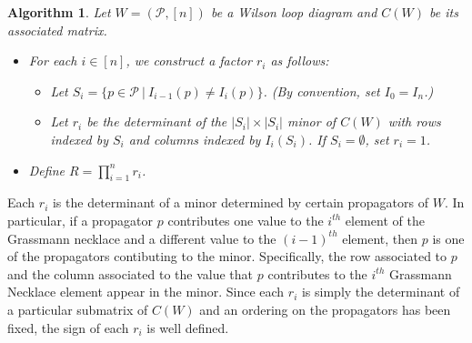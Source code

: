 \documentclass[11pt]{article}
\newcommand{\cP}{\mathcal{P}}
\newtheorem{algorithm}[thm]{Algorithm}
\theoremstyle{remark}
\theoremstyle{definition}
\begin{document}
\begin{algorithm}\label{alg WLD to denom via GN}
Let $W = (\cP, [n])$ be a Wilson loop diagram and $C(W)$ be its associated matrix. %
\begin{itemize}
  \item For each $i \in [n]$, we construct a factor $r_i$ as follows:
    \begin{itemize}
      \item Let $S_i = \{p \in \cP \ | \ I_{i-1}(p) \neq I_i(p)\}$. (By convention, set $I_{0} = I_n$.)
      \item Let $r_i$ be the determinant of the $|S_i|\times |S_i|$ minor of $C(W)$ with rows indexed by $S_i$ and columns indexed by $I_i(S_i)$.  If $S_i = \emptyset$, set $r_i = 1$. %
    \end{itemize}
  \item Define $R = \prod_{i=1}^n r_i$.
\end{itemize}
\end{algorithm}

Each $r_i$ is the determinant of a minor determined by certain propagators of $W$. In particular, if a propagator $p$ contributes one value to the $i^{th}$ element of the Grassmann necklace and a different value to the $(i-1)^{th}$ element, then $p$ is one of the propagators contibuting to the minor. Specifically, the row associated to $p$ and the column associated to the value that $p$ contributes to the $i^{th}$ Grassmann Necklace element appear in the minor.
Since each $r_i$ is simply the determinant of a particular submatrix of $C(W)$ and an ordering on the propagators has been fixed, the sign of each $r_i$ is well defined.
\end{document}
